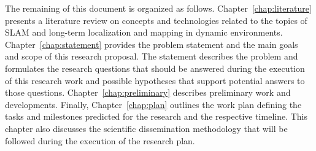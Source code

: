 The remaining of this document is organized as follows.
Chapter~\ref{chap:literature} presents a literature review on concepts and technologies related to the topics of \gls{SLAM} and long-term localization and mapping in dynamic environments.
Chapter~\ref{chap:statement} provides the problem statement and the main goals and scope of this research proposal. The statement describes the problem and formulates the research questions that should be answered during the execution of this research work and possible hypotheses that support potential answers to those questions.
Chapter~\ref{chap:preliminary} describes preliminary work and developments.
Finally, Chapter~\ref{chap:plan} outlines the work plan defining the tasks and milestones predicted for the research and the respective timeline. This chapter also discusses the scientific dissemination methodology that will be followed during the execution of the research plan.
